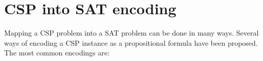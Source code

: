 \section{CSP into SAT encoding}\label{sec:csp_to_sat}
Mapping a CSP problem into a SAT problem can be done in many ways. Several ways of encoding a CSP instance as a propositional formula have been proposed. The most common encodings are:







